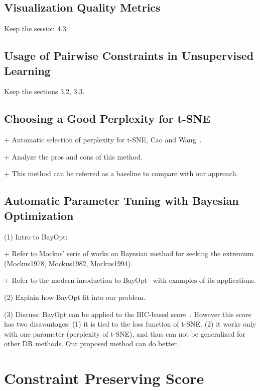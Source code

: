 \subsection{Visualization Quality Metrics}
Keep the session 4.3

\subsection{Usage of Pairwise Constraints in Unsupervised Learning}
Keep the sections 3.2, 3.3.

\subsection{Choosing a Good Perplexity for t-SNE}
+ Automatic selection of perplexity for t-SNE, Cao and Wang~\cite{cao2017automatic}.

+ Analyze the pros and cons of this method.

+ This method can be referred as a baseline to compare with our approach.

\subsection{Automatic Parameter Tuning with Bayesian Optimization}

(1) Intro to BayOpt:

+ Refer to Mockus' serie of works on Bayesian method for seeking the extremum (Mockus1978, Mockus1982, Mockus1994).

+ Refer to the modern inroduction to BayOpt~\cite{brochu2010tutorial} with examples of its applications.


\vspace{8pt} \par
(2) Explain how BayOpt fit into our problem.

\vspace{8pt} \par
(3) Discuss: BayOpt can be applied to the BIC-based score~\cite{cao2017automatic}.
However this score has two disavantages:
(1) it is tied to the loss function of t-SNE.
(2) it works only with one parameter (perplexity of t-SNE), and thus can not be generalized for other DR methods.
Our proposed method can do better.

\section{Constraint Preserving Score}

